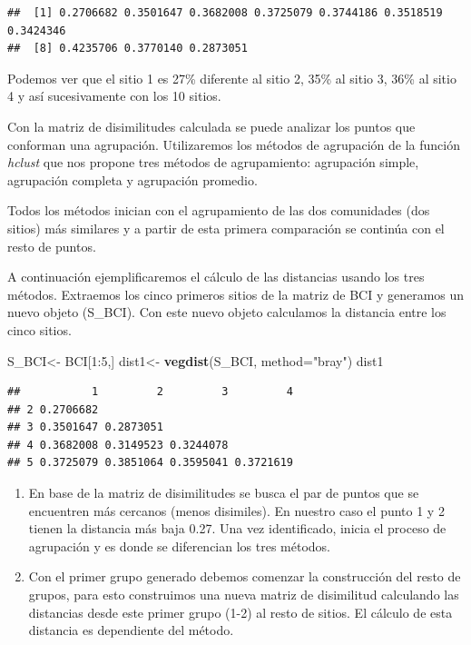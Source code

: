 \documentclass[]{book}
\newenvironment{Shaded}{\begin{snugshade}}{\end{snugshade}}
\newcommand{\KeywordTok}[1]{\textcolor[rgb]{0.13,0.29,0.53}{\textbf{{#1}}}}
\newcommand{\DataTypeTok}[1]{\textcolor[rgb]{0.13,0.29,0.53}{{#1}}}
\newcommand{\DecValTok}[1]{\textcolor[rgb]{0.00,0.00,0.81}{{#1}}}
\newcommand{\StringTok}[1]{\textcolor[rgb]{0.31,0.60,0.02}{{#1}}}
\newcommand{\NormalTok}[1]{{#1}}
\begin{document}
\begin{verbatim}
##  [1] 0.2706682 0.3501647 0.3682008 0.3725079 0.3744186 0.3518519 0.3424346
##  [8] 0.4235706 0.3770140 0.2873051
\end{verbatim}

Podemos ver que el sitio 1 es 27\% diferente al sitio 2, 35\% al sitio
3, 36\% al sitio 4 y así sucesivamente con los 10 sitios.

Con la matriz de disimilitudes calculada se puede analizar los puntos
que conforman una agrupación. Utilizaremos los métodos de agrupación de
la función \emph{hclust} que nos propone tres métodos de agrupamiento:
agrupación simple, agrupación completa y agrupación promedio.

Todos los métodos inician con el agrupamiento de las dos comunidades
(dos sitios) más similares y a partir de esta primera comparación se
continúa con el resto de puntos.

A continuación ejemplificaremos el cálculo de las distancias usando los
tres métodos. Extraemos los cinco primeros sitios de la matriz de BCI y
generamos un nuevo objeto (S\_BCI). Con este nuevo objeto calculamos la
distancia entre los cinco sitios.

\begin{Shaded}
\begin{Highlighting}[]
\NormalTok{S_BCI<-}\StringTok{ }\NormalTok{BCI[}\DecValTok{1}\NormalTok{:}\DecValTok{5}\NormalTok{,]}
\NormalTok{dist1<-}\StringTok{ }\KeywordTok{vegdist}\NormalTok{(S_BCI, }\DataTypeTok{method=}\StringTok{"bray"}\NormalTok{)}
\NormalTok{dist1}
\end{Highlighting}
\end{Shaded}

\begin{verbatim}
##           1         2         3         4
## 2 0.2706682                              
## 3 0.3501647 0.2873051                    
## 4 0.3682008 0.3149523 0.3244078          
## 5 0.3725079 0.3851064 0.3595041 0.3721619
\end{verbatim}

\begin{enumerate}
\def\labelenumi{\arabic{enumi}.}
\item
  En base de la matriz de disimilitudes se busca el par de puntos que se
  encuentren más cercanos (menos disimiles). En nuestro caso el punto 1
  y 2 tienen la distancia más baja 0.27. Una vez identificado, inicia el
  proceso de agrupación y es donde se diferencian los tres métodos.
\item
  Con el primer grupo generado debemos comenzar la construcción del
  resto de grupos, para esto construimos una nueva matriz de disimilitud
  calculando las distancias desde este primer grupo (1-2) al resto de
  sitios. El cálculo de esta distancia es dependiente del método.
\end{enumerate}
\end{document}
